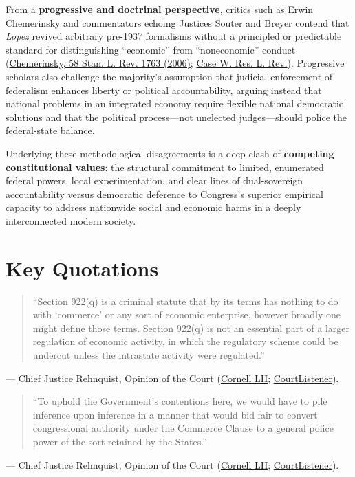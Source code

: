 \documentclass[12pt]{article}
\begin{document}
From a \textbf{progressive and doctrinal perspective}, critics such as Erwin Chemerinsky and commentators echoing Justices Souter and Breyer contend that \textit{Lopez} revived arbitrary pre-1937 formalisms without a principled or predictable standard for distinguishing ``economic'' from ``noneconomic'' conduct (\href{http://www.stanfordlawreview.org/wp-content/uploads/sites/3/2010/04/chemerinsky.pdf}{Chemerinsky, 58 Stan. L. Rev. 1763 (2006)}; \href{https://scholarlycommons.law.case.edu/cgi/viewcontent.cgi?article=4685&context=caselrev}{Case W. Res. L. Rev.}). Progressive scholars also challenge the majority's assumption that judicial enforcement of federalism enhances liberty or political accountability, arguing instead that national problems in an integrated economy require flexible national democratic solutions and that the political process---not unelected judges---should police the federal-state balance.

Underlying these methodological disagreements is a deep clash of \textbf{competing constitutional values}: the structural commitment to limited, enumerated federal powers, local experimentation, and clear lines of dual-sovereign accountability versus democratic deference to Congress's superior empirical capacity to address nationwide social and economic harms in a deeply interconnected modern society.

\section{Key Quotations}
\begin{quote}
``Section 922(q) is a criminal statute that by its terms has nothing to do with `commerce' or any sort of economic enterprise, however broadly one might define those terms. Section 922(q) is not an essential part of a larger regulation of economic activity, in which the regulatory scheme could be undercut unless the intrastate activity were regulated.''
\end{quote}
\noindent --- Chief Justice Rehnquist, Opinion of the Court (\href{https://www.law.cornell.edu/supct/html/93-1260.ZO.html}{Cornell LII}; \href{https://www.courtlistener.com/opinion/117927/united-states-v-lopez/}{CourtListener}).

\begin{quote}
``To uphold the Government's contentions here, we would have to pile inference upon inference in a manner that would bid fair to convert congressional authority under the Commerce Clause to a general police power of the sort retained by the States.''
\end{quote}
\noindent --- Chief Justice Rehnquist, Opinion of the Court (\href{https://www.law.cornell.edu/supct/html/93-1260.ZO.html}{Cornell LII}; \href{https://www.courtlistener.com/opinion/117927/united-states-v-lopez/}{CourtListener}).
\end{document}
